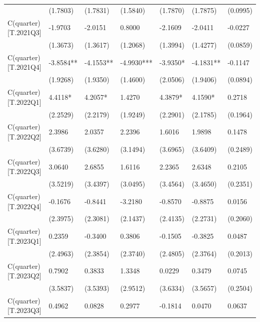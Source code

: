\begin{table}
\begin{center}
\begin{tabular}{lllllll}
                         & (1.7803)   & (1.7831)   & (1.5840)   & (1.7870)   & (1.7875)   & (0.0995)    \\
C(quarter)[T.2021Q3]     & -1.9703    & -2.0151    & 0.8000     & -2.1609    & -2.0411    & -0.0227     \\
                         & (1.3673)   & (1.3617)   & (1.2068)   & (1.3994)   & (1.4277)   & (0.0859)    \\
C(quarter)[T.2021Q4]     & -3.8584**  & -4.1553**  & -4.9930*** & -3.9350*   & -4.1831**  & -0.1147     \\
                         & (1.9268)   & (1.9350)   & (1.4600)   & (2.0506)   & (1.9406)   & (0.0894)    \\
C(quarter)[T.2022Q1]     & 4.4118*    & 4.2057*    & 1.4270     & 4.3879*    & 4.1590*    & 0.2718      \\
                         & (2.2529)   & (2.2179)   & (1.9249)   & (2.2901)   & (2.1785)   & (0.1964)    \\
C(quarter)[T.2022Q2]     & 2.3986     & 2.0357     & 2.2396     & 1.6016     & 1.9898     & 0.1478      \\
                         & (3.6739)   & (3.6280)   & (3.1494)   & (3.6965)   & (3.6409)   & (0.2489)    \\
C(quarter)[T.2022Q3]     & 3.0640     & 2.6855     & 1.6116     & 2.2365     & 2.6348     & 0.2105      \\
                         & (3.5219)   & (3.4397)   & (3.0495)   & (3.4564)   & (3.4650)   & (0.2351)    \\
C(quarter)[T.2022Q4]     & -0.1676    & -0.8441    & -3.2180    & -0.8570    & -0.8875    & 0.0156      \\
                         & (2.3975)   & (2.3081)   & (2.1437)   & (2.4135)   & (2.2731)   & (0.2060)    \\
C(quarter)[T.2023Q1]     & 0.2359     & -0.3400    & 0.3806     & -0.1505    & -0.3825    & 0.0487      \\
                         & (2.4963)   & (2.3854)   & (2.3740)   & (2.4805)   & (2.3764)   & (0.2013)    \\
C(quarter)[T.2023Q2]     & 0.7902     & 0.3833     & 1.3348     & 0.0229     & 0.3479     & 0.0745      \\
                         & (3.5837)   & (3.5393)   & (2.9512)   & (3.6334)   & (3.5657)   & (0.2504)    \\
C(quarter)[T.2023Q3]     & 0.4962     & 0.0828     & 0.2977     & -0.1814    & 0.0470     & 0.0637      \\

\end{tabular}
\end{center}
\end{table}
